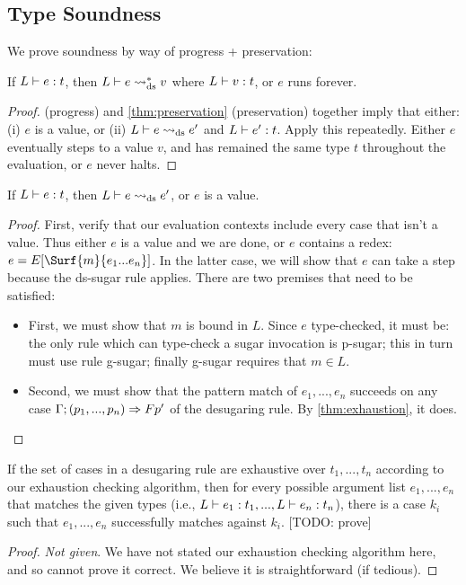 \subsection{Type Soundness}

We prove soundness by way of progress + preservation:
\begin{theorem}[Soundness]
  If $L \vdash e : t$, then
  $L \vdash e \rightsquigarrow^{*}_\text{ds} v$ where $L \vdash v : t$, or $e$ runs forever.
\end{theorem}
\begin{proof}
 (progress) and \cref{thm:preservation}
(preservation) together imply that either:
(i) $e$ is a value, or (ii) $L \vdash e \rightsquigarrow_\text{ds} e'$ and $L \vdash e' : t$.
Apply this repeatedly. Either $e$ eventually steps to a value $v$, and
has remained the same type $t$ throughout the evaluation, or $e$ never
halts.
\end{proof}

\begin{lemma}[Progress] \label{thm:progress}
  If $L \vdash e : t$, then
  $L \vdash e \rightsquigarrow_\text{ds} e'$, or $e$ is a value.
\end{lemma}
\begin{proof}
  First, verify that our evaluation contexts include every case that
  isn't a value. Thus either $e$ is a value and we are done, or $e$
  contains a redex: $e=E[\Surf{m}{e_1 ... e_n}]$.
  In the latter case, we will show that $e$ can take a step because
  the ds-sugar rule applies. There are two premises that need to be
  satisfied:
  \begin{itemize}
    \item First, we must show that $m$ is bound in $L$. Since $e$
      type-checked, it must be: the only rule which can type-check a
      sugar invocation is p-sugar; this in turn must use rule
      g-sugar; finally g-sugar requires that $m \in L$.
    \item Second, we must show that the pattern match of $e_1,...,e_n$
      succeeds on any case ${\Gamma;(p_1,...,p_n) \Rightarrow F{p'}}$
      of the desugaring
      rule. By \cref{thm:exhaustion}, it does.
  \end{itemize}
\end{proof}

\begin{assumption}[Exhaustion] \label{thm:exhaustion}
  If the set of cases in a desugaring rule are exhaustive over
  $t_1,...,t_n$ according to our exhaustion checking algorithm, then
  for every possible argument list $e_1,...,e_n$ that matches the
  given types (i.e., $L \vdash e_1 : t_1,...,L \vdash e_n : t_n$),
  there is a case $k_i$ such that $e_1,...,e_n$ successfully matches
  against $k_i$. [TODO: prove]
\end{assumption}
\begin{proof}
  \emph{Not given}. We have not stated our exhaustion checking
  algorithm here, and so cannot prove it correct. We believe it is
  straightforward (if tedious).
\end{proof}


